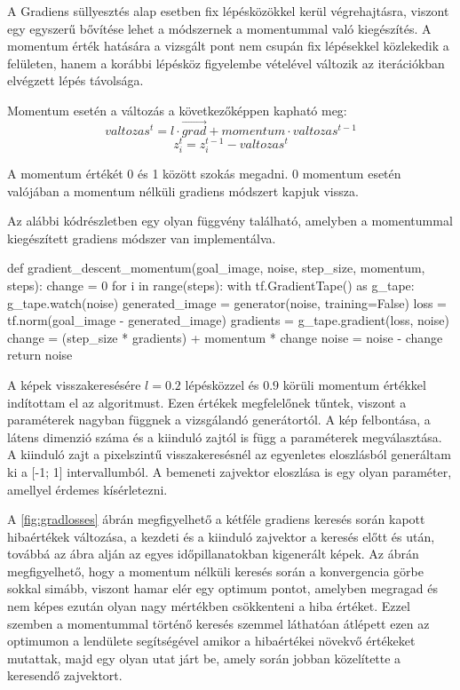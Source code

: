 A Gradiens süllyesztés alap esetben fix lépésközökkel kerül végrehajtásra, viszont egy egyszerű bővítése lehet a módszernek a momentummal való kiegészítés. A momentum érték hatására a vizsgált pont nem csupán fix lépésekkel közlekedik a felületen, hanem a korábbi lépésköz figyelembe vételével változik az iterációkban elvégzett lépés távolsága.

Momentum esetén a változás a következőképpen kapható meg:
$$valtozas^t = l \cdot \vec{grad} + momentum \cdot valtozas^{t-1}$$
$$z_i^t = z_i^{t-1} - valtozas^t $$

A momentum értékét 0 és 1 között szokás megadni. 0 momentum esetén valójában a momentum nélküli gradiens módszert kapjuk vissza.

Az alábbi kódrészletben egy olyan függvény található, amelyben a momentummal kiegészített gradiens módszer van implementálva.
\begin{python}
def gradient_descent_momentum(goal_image, noise, step_size,
                              momentum, steps):
    change = 0
    for i in range(steps):
        with tf.GradientTape() as g_tape:
            g_tape.watch(noise)
            generated_image = generator(noise, training=False)
            loss = tf.norm(goal_image - generated_image)
        gradients = g_tape.gradient(loss, noise)
        change = (step_size * gradients) + momentum * change
        noise = noise - change
    return noise
\end{python}

A képek visszakeresésére $l=0.2$ lépésközzel és $0.9$ körüli momentum értékkel indítottam el az algoritmust. Ezen értékek megfelelőnek tűntek, viszont a paraméterek nagyban függnek a vizsgálandó generátortól. A kép felbontása, a látens dimenzió száma és a kiinduló zajtól is függ a paraméterek megválasztása.
A kiinduló zajt a pixelszintű visszakeresésnél az egyenletes eloszlásból generáltam ki a [-1; 1] intervallumból. A bemeneti zajvektor eloszlása is egy olyan paraméter, amellyel érdemes kísérletezni.

A \ref{fig:gradlosses} ábrán megfigyelhető a kétféle gradiens keresés során kapott hibaértékek változása, a kezdeti és a kiinduló zajvektor a keresés előtt és után, továbbá az ábra alján az egyes időpillanatokban kigenerált képek. Az ábrán megfigyelhető, hogy a momentum nélküli keresés során a konvergencia görbe sokkal simább, viszont hamar elér egy optimum pontot, amelyben megragad és nem képes ezután olyan nagy mértékben csökkenteni a hiba értéket. Ezzel szemben a momentummal történő keresés szemmel láthatóan átlépett ezen az optimumon a lendülete segítségével amikor a hibaértékei növekvő értékeket mutattak, majd egy olyan utat járt be, amely során jobban közelítette a keresendő zajvektort.

